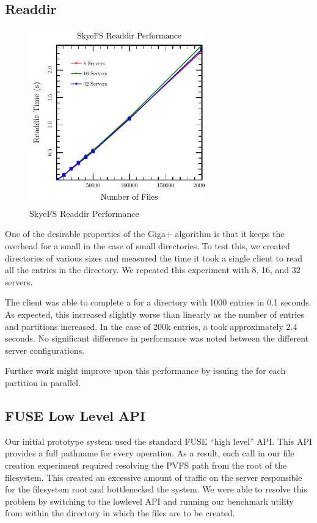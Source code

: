 \documentclass[onecolumn, 11pt, letterpaper]{article}
\begin{document}
\subsection{Readdir}
\begin{figure}
\begin{center}
\includegraphics[width=3in]{graph-readdir}
\end{center}
\caption{SkyeFS Readdir Performance}
\end{figure}
One of the desirable properties of the Giga+ algorithm is that it keeps the
overhead for a  small in the case of small directories.  To test
this, we created directories of various sizes and measured the time it took a
single client to read all the entries in the directory.  We repeated this
experiment with 8, 16, and 32 servers.

The client was able to complete a  for a directory with 1000
entries in 0.1 seconds.  As expected, this increased slightly worse than
linearly as the number of entries and partitions increased.  In the case of
200k entries, a  took approximately 2.4 seconds.  No significant
difference in performance was noted between the different server
configurations.

Further work might improve upon this performance by issuing the 
for each partition in parallel.

\subsection{FUSE Low Level API}
Our initial prototype system used the standard FUSE ``high level'' API.  This
API provides a full pathname for every operation.  As a result, each
 call in our file creation experiment required resolving the PVFS
path from the root of the filesystem.  This created an excessive amount of
traffic on the server responsible for the filesystem root and bottlenecked the
system.  We were able to resolve this problem by switching to the lowlevel API
and running our benchmark utility from within the directory in which the files
are to be created.
\end{document}

